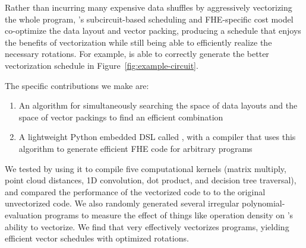 Rather than incurring many expensive data shuffles by aggressively vectorizing the whole program, \system's subcircuit-based scheduling and FHE-specific cost model co-optimize the data layout and vector packing, producing a schedule that enjoys the benefits of vectorization while still being able to efficiently realize the necessary rotations. For example, \system is able to correctly generate the better vectorization schedule in Figure~\ref{fig:example-circuit}.





The specific contributions we make are:
\begin{enumerate}
    \item An algorithm for simultaneously searching the space of data layouts and the space of vector packings to find an efficient combination%
    \item A lightweight Python embedded DSL called \system, with a compiler that uses this algorithm to generate efficient FHE code for arbitrary programs
\end{enumerate}

We tested \system by using it to compile five computational kernels (matrix multiply, point cloud distances, 1D convolution, dot product, and decision tree traversal), and compared the performance of the vectorized code to to the original unvectorized code.
We also randomly generated several irregular polynomial-evaluation programs to measure the effect of things like operation density on \system's ability to vectorize. 
We find that \system very effectively vectorizes programs, yielding efficient vector schedules with optimized rotations.

